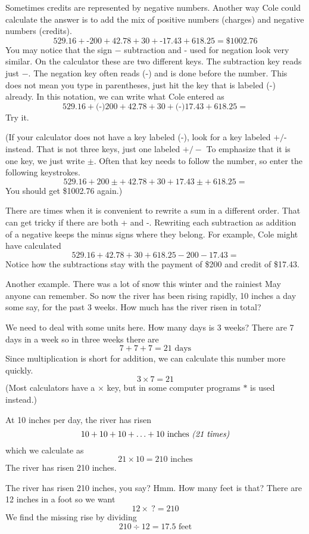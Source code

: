 Sometimes credits are represented by negative numbers.  Another way Cole could calculate the answer is to add the mix of positive numbers (charges) and negative numbers (credits).
$$529.16 + \text{-}200 + 42.78 + 30 + \text{-}17.43 + 618.25 = \$1002.76$$
You may notice that the sign $-$ subtraction and - used for negation look very similar.  On the calculator these are two different keys.  The subtraction key reads just $-$.  The negation key often reads (-) and is done before the number.  This does not mean you type in parentheses, just hit the key that is labeled (-) already.  In this notation, we can write what Cole entered as
$$529.16 + \text{(-)}200 + 42.78 + 30 +  \text{(-)}17.43 + 618.25 =$$
Try it.

(If your calculator does not have a key labeled (-), look for a key labeled $\text{+/-}$ instead.   That is not three keys, just one labeled $+/-$ To emphasize that it is one key, we just write $\pm$.  Often that key needs to follow the number, so enter the following keystrokes.
$$529.16 + 200 \pm + ~42.78 + 30 +  17.43 \pm + ~618.25 =$$
You should get \$1002.76 again.)

There are times when it is convenient to rewrite a sum in a different order.  That can get tricky if there are both + and -.  Rewriting each subtraction as addition of a negative keeps the minus signs where they belong.  For example, Cole might have calculated
$$529.16 + 42.78 + 30 + 618.25 -200 - 17.43 = $$
Notice how the subtractions stay with the payment of \$200 and credit of \$17.43.  

Another example.  There was a lot of snow this winter and the rainiest May anyone can remember.  So now the river has been rising rapidly, 10 inches a day some say, for the past 3 weeks.  How much has the river risen in total?  

We need to deal with some units here. %
How many days is 3 weeks?  There are 7 days in a week so in three weeks there are 
$$7 + 7 + 7 = 21 \text{ days}$$
Since multiplication is short for addition, we can calculate this number more quickly.
$$ 3 \times 7 = 21$$
(Most calculators have a $\times$ key, but in some computer programs $\ast$ is used instead.)

At 10 inches per day, the river has risen
$$ 10 + 10 + 10 + \ldots + 10 \text{ inches \emph{(21 times)}}$$
which we calculate as 
$$ 21 \times 10 = 210 \text{ inches}$$
The river has risen 210 inches.

The river has risen 210 inches, you say? Hmm. How many feet is that?  There are 12 inches in a foot so we want 
$$ 12 \times ~? = 210$$
We find the missing rise by dividing
$$ 210 \div 12 = 17.5 \text{ feet}$$

